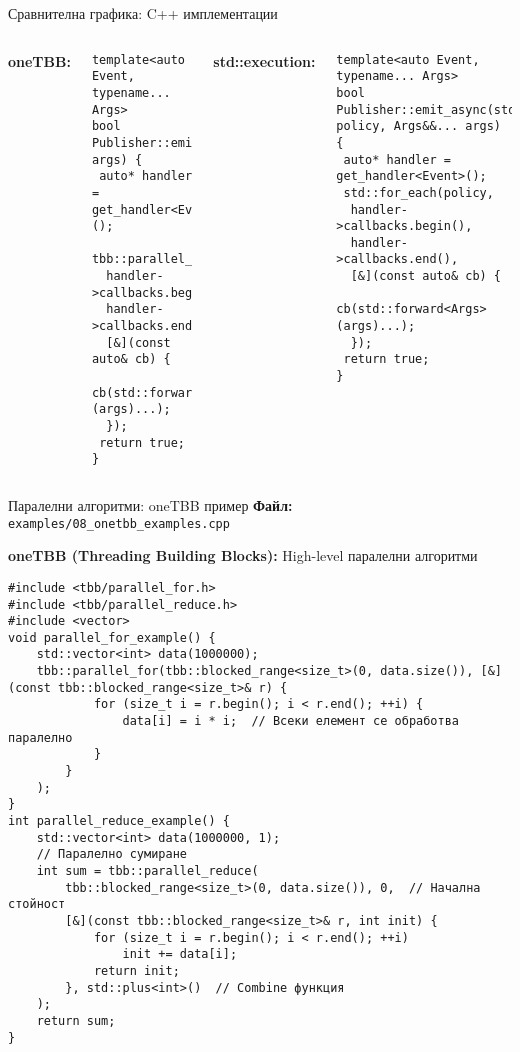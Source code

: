 \documentclass[aspectratio=169]{beamer}
\begin{document}
\begin{frame}[fragile]{Сравнителна графика: C++ имплементации}
\begin{columns}[T]

\textbf{\tiny oneTBB:}
\begin{lstlisting}[basicstyle=\ttfamily\tiny, numbers=none, frame=none, backgroundcolor=\color{gray!5}]
template<auto Event, typename... Args>
bool Publisher::emit_tbb_async(Args&&... args) {
 auto* handler = get_handler<Event>();
 tbb::parallel_for_each(
  handler->callbacks.begin(),
  handler->callbacks.end(),
  [&](const auto& cb) {
   cb(std::forward<Args>(args)...);
  });
 return true;
}
\end{lstlisting}
\textbf{\tiny std::execution:}
\begin{lstlisting}[basicstyle=\ttfamily\tiny, numbers=none, frame=none, backgroundcolor=\color{gray!5}]
template<auto Event, typename... Args>
bool Publisher::emit_async(std::execution::parallel_policy policy, Args&&... args) {
 auto* handler = get_handler<Event>();
 std::for_each(policy,
  handler->callbacks.begin(),
  handler->callbacks.end(),
  [&](const auto& cb) {
    cb(std::forward<Args>(args)...);
  });
 return true;
}
\end{lstlisting}
\end{columns}
\end{frame}

\begin{frame}[fragile]{Паралелни алгоритми: oneTBB пример}
\textbf{Файл:} \texttt{examples/08\_onetbb\_examples.cpp}

\textbf{oneTBB (Threading Building Blocks):} High-level паралелни алгоритми

\begin{lstlisting}[basicstyle=\ttfamily\tiny]
#include <tbb/parallel_for.h>
#include <tbb/parallel_reduce.h>
#include <vector>
void parallel_for_example() {
    std::vector<int> data(1000000);
    tbb::parallel_for(tbb::blocked_range<size_t>(0, data.size()), [&](const tbb::blocked_range<size_t>& r) {
            for (size_t i = r.begin(); i < r.end(); ++i) {
                data[i] = i * i;  // Всеки елемент се обработва паралелно
            }
        }
    );
}
int parallel_reduce_example() {
    std::vector<int> data(1000000, 1);
    // Паралелно сумиране
    int sum = tbb::parallel_reduce(
        tbb::blocked_range<size_t>(0, data.size()), 0,  // Начална стойност
        [&](const tbb::blocked_range<size_t>& r, int init) {
            for (size_t i = r.begin(); i < r.end(); ++i)
                init += data[i];
            return init;
        }, std::plus<int>()  // Combine функция
    );
    return sum;
}
\end{lstlisting}
\end{frame}
\end{document}
